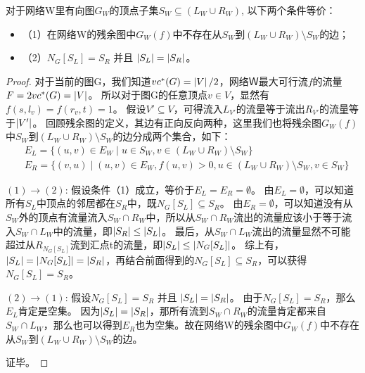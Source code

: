 \begin{lemma} \label{residualgraph1}
对于网络W里有向图$G_W$的顶点子集$S_W \subseteq (L_W \cup R_W)$, 以下两个条件等价：
\begin{itemize}
  \item {（1）}在网络W的残余图中$G_W(f)$中不存在从$S_W$到$(L_W \cup R_W) \setminus S_W$的边；
  \item {（2）}$N_G[S_L] = S_R$ 并且 $\left\vert S_L \right\vert = \left\vert S_R \right\vert$。
\end{itemize}


\end{lemma}
\begin{proof}
  对于当前的图G，我们知道$vc^*(G) = \left\vert V \right\vert / 2$，网络Ｗ最大可行流$f$的流量$F=2vc^*(G)=\left\vert V \right\vert$。
  所以对于图G的任意顶点$v \in V$，显然有$f(s, l_v) = f(r_v, t) = 1$。
  假设$V' \subseteq V$，可得流入$L_{V'}$的流量等于流出$R_{V'}$的流量等于$\left\vert V' \right\vert$。
  回顾残余图的定义，其边有正向反向两种，这里我们也将残余图$G_W(f)$中$S_W$到$(L_W \cup R_W) \setminus S_W$的边分成两个集合，如下：
  \begin{equation*} \begin{aligned}
    & E_L = \{(u, v) \in E_W\;|\;u \in S_W,v \in (L_W \cup R_W) \setminus S_W\} \\
    & E_R = \{(v, u)\;|\;(u, v) \in E_W,f(u, v) > 0,u \in (L_W \cup R_W) \setminus S_W,v \in S_W\}
  \end{aligned} \end{equation*}
    

  $(1)\rightarrow (2)$: 假设条件（1）成立，等价于$E_L = E_R = \emptyset$。
  由$E_L = \emptyset$，可以知道所有$S_L$中顶点的邻居都在$S_R$中，既$N_G[S_L] \subseteq S_R$。
  由$E_R = \emptyset$，可以知道没有从$S_W$外的顶点有流量流入$S_W \cap R_W$中，所以从$S_W \cap R_W$流出的流量应该小于等于流入$S_W \cap L_W$中的流量，即$\left\vert S_R \right\vert \le \left\vert S_L \right\vert$。
  最后，从$S_W \cap L_W$流出的流量显然不可能超过从$R_{N_G[S_L]}$流到汇点t的流量，即$\left\vert S_L \right\vert \le \left\vert N_G[S_L] \right\vert$。
  综上有，$\left\vert S_L \right\vert = \left\vert N_G[S_L] \right\vert = \left\vert S_R \right\vert$，再结合前面得到的$N_G[S_L] \subseteq S_R$，可以获得$N_G[S_L] = S_R$。

  $(2)\rightarrow (1)$: 假设$N_G[S_L] = S_R$ 并且 $\left\vert S_L \right\vert = \left\vert S_R \right\vert$。
  由于$N_G[S_L] = S_R$，那么$E_L$肯定是空集。
  因为$\left\vert S_L \right\vert = \left\vert S_R \right\vert$，那所有流到$S_W \cap R_W$的流量肯定都来自$S_W \cap L_W$，那么也可以得到$E_R$也为空集。故在网络W的残余图中$G_W(f)$中不存在从$S_W$到$(L_W \cup R_W) \setminus S_W$的边。

  证毕。
\end{proof}

